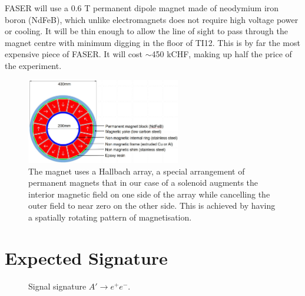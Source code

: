 FASER will use a 0.6 T permanent dipole magnet made of neodymium iron boron (NdFeB), which unlike electromagnets does not require high voltage power or cooling. It will be thin enough to allow the line of sight to pass through the magnet centre with minimum digging in the floor of TI12. This is by far the most expensive piece of FASER. It will cost $\sim$450 kCHF, making up half the price of the experiment.

\begin{figure}[htbp!] 
\centering    
\includegraphics[width=0.6\textwidth]{ChapterFaser/Figs/Raster/MagnetDesign.jpg}
\caption[Magnet Design]{The magnet uses a Hallbach array, a special arrangement of permanent magnets that in our case of a solenoid augments the interior magnetic field on one side of the array while cancelling the outer field to near zero on the other side. This is achieved by having a spatially rotating pattern of magnetisation.
}
\label{fig:MagnetDesign}
\end{figure}

\section{Expected Signature}

\begin{figure}[htbp!] 
\centering    
\caption{Signal signature $A'\rightarrow e^{+}e^{-}$.}
\label{fig:SignalSignature}
\end{figure}

